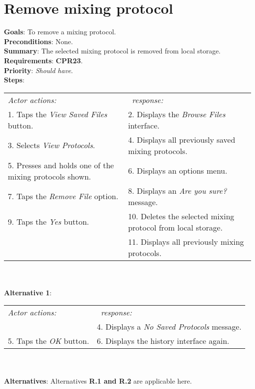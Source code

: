 \section{Remove mixing protocol}
 \label{removedist}
  \textbf{Goals}: To remove a mixing protocol.\\
  \textbf{Preconditions}: None.\\
  \textbf{Summary}: The selected mixing protocol is removed from local storage.\\
  \textbf{Requirements}: \textbf{CPR23}.\\
  \textbf{Priority}: \emph{Should have}.\\
  \textbf{Steps}: \\
    \begin{tabular}{ p{} p{} }
  	\emph{Actor actions:} & \emph{\projectname\ response:} \\
    1. Taps the \emph{View Saved Files} button. & 2. Displays the \emph{Browse Files} interface.\\
    3. Selects \emph{View Protocols}. & 4. Displays all previously saved mixing protocols.\\
    5. Presses and holds one of the mixing protocols shown. & 6. Displays an options menu. \\
    7. Taps the \emph{Remove File} option. & 8. Displays an \emph{Are you sure?} message.\\
    9. Taps the \emph{Yes} button. & 10. Deletes the selected mixing protocol from local storage. \\
     & 11. Displays all previously mixing protocols.\\
    \end{tabular}
                \\
     \\\textbf{Alternative 1}: \\
    \begin{tabular}{ p{} p{} }
  	\emph{Actor actions:} & \emph{\projectname\ response:} \\
            & 4. Displays a \emph{No Saved Protocols} message. \\
    5. Taps the \emph{OK} button. & 6. Displays the history interface again. \\
    \end{tabular}
    \\
    \\\textbf{Alternatives}: Alternatives \textbf{R.1 and R.2} are applicable here.

